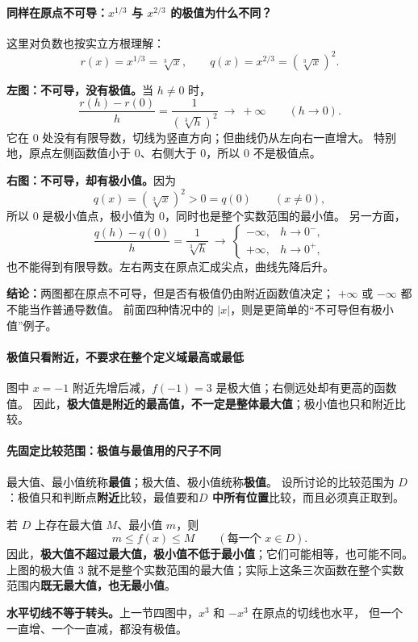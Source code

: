 \clearpage
\begin{explanationbox}
\paragraph{同样在原点不可导：$x^{1/3}$ 与 $x^{2/3}$ 的极值为什么不同？}
这里对负数也按实立方根理解：
\[
 r(x)=x^{1/3}=\sqrt[3]{x},\qquad q(x)=x^{2/3}=(\sqrt[3]{x})^2.
\]
\begin{center}\end{center}

\textbf{左图：不可导，没有极值。}当 $h\ne0$ 时，
\[
\frac{r(h)-r(0)}{h}=\frac{1}{(\sqrt[3]{h})^2}
\ \longrightarrow\ +\infty\qquad(h\to0).
\]
它在 $0$ 处没有有限导数，切线为竖直方向；但曲线仍从左向右一直增大。
特别地，原点左侧函数值小于 $0$、右侧大于 $0$，所以 $0$ 不是极值点。

\textbf{右图：不可导，却有极小值。}因为
\[
q(x)=(\sqrt[3]{x})^2>0=q(0)\qquad(x\ne0),
\]
所以 $0$ 是极小值点，极小值为 $0$，同时也是整个实数范围的最小值。
另一方面，
\[
\frac{q(h)-q(0)}{h}=\frac{1}{\sqrt[3]{h}}
\ \longrightarrow\
\begin{cases}-\infty,&h\to0^-,\\+\infty,&h\to0^+,\end{cases}
\]
也不能得到有限导数。左右两支在原点汇成尖点，曲线先降后升。

\textbf{结论：}两图都在原点不可导，但是否有极值仍由附近函数值决定；
$+\infty$ 或 $-\infty$ 都不能当作普通导数值。
前面四种情况中的 $|x|$，则是更简单的“不可导但有极小值”例子。
\end{explanationbox}
\clearpage
\begin{explanationbox}
\paragraph{极值只看附近，不要求在整个定义域最高或最低}

\begin{center}\end{center}

图中 $x=-1$ 附近先增后减，$f(-1)=3$ 是极大值；右侧远处却有更高的函数值。
因此，\textbf{极大值是附近的最高值，不一定是整体最大值}；极小值也只和附近比较。

\paragraph{先固定比较范围：极值与最值用的尺子不同}
最大值、最小值统称\textbf{最值}；极大值、极小值统称\textbf{极值}。
设所讨论的比较范围为 $D$：极值只和判断点\textbf{附近}比较，最值要和\textbf{$D$ 中所有位置}比较，而且必须真正取到。

若 $D$ 上存在最大值 $M$、最小值 $m$，则
\[
 m\le f(x)\le M\qquad(\text{每一个 }x\in D).
\]
因此，\textbf{极大值不超过最大值，极小值不低于最小值}；它们可能相等，也可能不同。
上图的极大值 $3$ 就不是整个实数范围的最大值；实际上这条三次函数在整个实数范围内\textbf{既无最大值，也无最小值}。

\textbf{水平切线不等于转头。}上一节四图中，$x^3$ 和 $-x^3$ 在原点的切线也水平，
但一个一直增、一个一直减，都没有极值。
\end{explanationbox}
